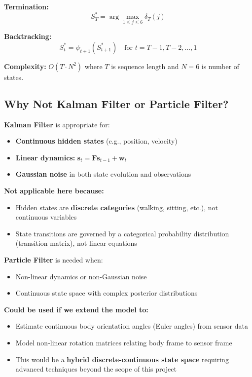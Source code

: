 \documentclass[11pt,a4paper]{article}
\newcommand{\bs}{\mathbf{s}}
\begin{document}
\textbf{Termination:}
\begin{equation}
S_T^* = \arg\max_{1 \leq j \leq 6} \delta_T(j)
\end{equation}

\textbf{Backtracking:}
\begin{equation}
S_t^* = \psi_{t+1}(S_{t+1}^*) \quad \text{for } t = T-1, T-2, \ldots, 1
\end{equation}

\textbf{Complexity:} $O(T \cdot N^2)$ where $T$ is sequence length and $N = 6$ is number of states.

\subsection{Why Not Kalman Filter or Particle Filter?}

\textbf{Kalman Filter} is appropriate for:
\begin{itemize}[leftmargin=*]
    \item \textbf{Continuous hidden states} (e.g., position, velocity)
    \item \textbf{Linear dynamics:} $\bs_t = \mathbf{F} \bs_{t-1} + \mathbf{w}_t$
    \item \textbf{Gaussian noise} in both state evolution and observations
\end{itemize}

\textbf{Not applicable here because:}
\begin{itemize}[leftmargin=*]
    \item Hidden states are \textbf{discrete categories} (walking, sitting, etc.), not continuous variables
    \item State transitions are governed by a categorical probability distribution (transition matrix), not linear equations
\end{itemize}

\textbf{Particle Filter} is needed when:
\begin{itemize}[leftmargin=*]
    \item Non-linear dynamics or non-Gaussian noise
    \item Continuous state space with complex posterior distributions
\end{itemize}

\textbf{Could be used if we extend the model to:}
\begin{itemize}[leftmargin=*]
    \item Estimate continuous body orientation angles (Euler angles) from sensor data
    \item Model non-linear rotation matrices relating body frame to sensor frame
    \item This would be a \textbf{hybrid discrete-continuous state space} requiring advanced techniques beyond the scope of this project
\end{itemize}
\end{document}
